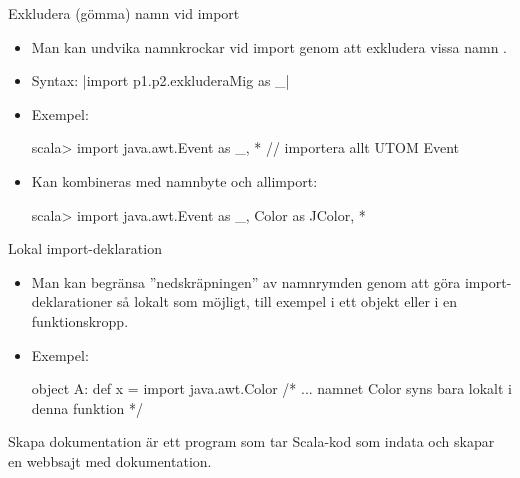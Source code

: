 \begin{Slide}{Exkludera (gömma) namn vid import}
\begin{itemize}
\item Man kan undvika namnkrockar vid import genom att exkludera vissa namn .
\item Syntax:  \code|import p1.p2.exkluderaMig as _|
\item Exempel:
\begin{REPL}
scala> import java.awt.{Event as _, *}  // importera allt UTOM Event
\end{REPL}
\item Kan kombineras med namnbyte och allimport:
\begin{REPL}
scala> import java.awt.{Event as _, Color as JColor, *}
\end{REPL}
\end{itemize}
\end{Slide}

\begin{Slide}{Lokal import-deklaration}
\begin{itemize}
\item Man kan begränsa ''nedskräpningen'' av namnrymden genom att göra import-deklarationer så lokalt som möjligt, till exempel i ett objekt eller i en funktionskropp.
\item Exempel:
\begin{Code}
object A:
  def x = 
    import java.awt.Color
    /* ... namnet Color syns bara lokalt i denna funktion */
\end{Code}
\end{itemize}
\end{Slide}


\begin{Slide}{Skapa dokumentation}
 är ett program som tar Scala-kod som indata och skapar en webbsajt med dokumentation.

\vspace{2em}

\end{Slide}

